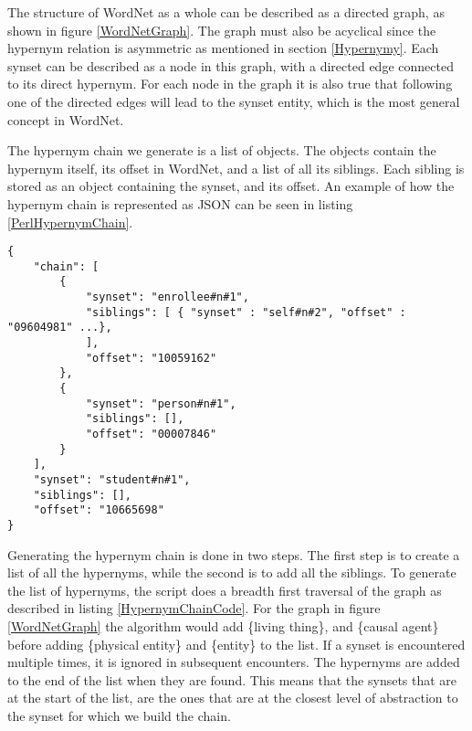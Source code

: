 The structure of WordNet as a whole can be described as a directed graph, as shown in figure \ref{WordNetGraph}.
The graph must also be acyclical since the hypernym relation is asymmetric as mentioned in section \ref{Hypernymy}.
Each synset can be described as a node in this graph, with a directed edge connected to its direct hypernym.
For each node in the graph it is also true that following one of the directed edges will lead to the synset entity,
which is the most general concept in WordNet.

The hypernym chain we generate is a list of objects.
The objects contain the hypernym itself, its offset in WordNet, and a list of all its siblings.
Each sibling is stored as an object containing the synset, and its offset.
An example of how the hypernym chain is represented as JSON can be seen in listing \ref{PerlHypernymChain}.

\begin{lstlisting}[float=t, label=PerlHypernymChain, caption={Excerpt from the hypernym chain for student\#n\#1}]
{
	"chain": [
		{
			"synset": "enrollee#n#1",
			"siblings": [ { "synset" : "self#n#2", "offset" : "09604981" ...},
			],
			"offset": "10059162"
		},
		{
			"synset": "person#n#1",
			"siblings": [],
			"offset": "00007846"
		}
	],
	"synset": "student#n#1",
	"siblings": [],
	"offset": "10665698"
}
\end{lstlisting}

Generating the hypernym chain is done in two steps.
The first step is to create a list of all the hypernyms,
while the second is to add all the siblings.
To generate the list of hypernyms, the script does a breadth first traversal of the graph as described in listing \ref{HypernymChainCode}.
For the graph in figure \ref{WordNetGraph} the algorithm would add \{living thing\},
and \{causal agent\} before adding \{physical entity\} and \{entity\} to the list.
If a synset is encountered multiple times, it is ignored in subsequent encounters.
The hypernyms are added to the end of the list when they are found.
This means that the synsets that are at the start of the list,
are the ones that are at the closest level of abstraction to the synset for which we build the chain.

